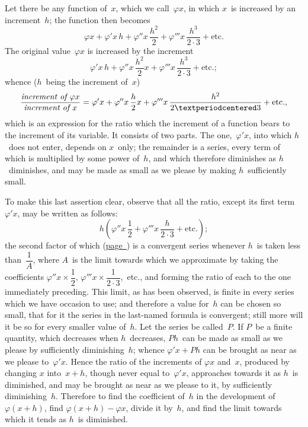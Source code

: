 \documentclass[12pt]{book}[2005/09/16]
\newcommand{\Pagelabel}[1]{\phantomsection\label{page:#1}}
\newcommand{\PageSep}[1]{\Pagelabel{#1}\ignorespaces}
\newcommand{\PageRef}[2][page]{\hyperref[page:#2]{#1~\pageref*{page:#2}}}
\renewcommand{\etc}{\text{etc}}
\renewcommand{\(}{{\upshape(}}
\renewcommand{\)}{{\upshape)}}
\renewcommand{\phi}{\varphi}
\begin{document}
Let there be any function of~$x$, which we call~$\phi x$,
in which $x$~is increased by an increment~$h$; the function
then becomes
\[
\phi x + \phi' x\, h
       + \phi'' x\, \frac{h^{2}}{2}
       + \phi''' x\, \frac{h^{3}}{2·3} + \etc.
\]
\PageSep{23}
The original value~$\phi x$ is increased by the increment
\[
\phi' x\, h + \phi'' x\, \frac{h^{2}}{2} x
            + \phi''' x\, \frac{h^{3}}{2·3} + \etc.;
\]
whence ($h$~being the increment of~$x$)
\[
\frac{\emph{increment of } \phi x}{\emph{increment of } x}
  = \phi' x + \phi'' x\, \frac{h}{2} x
            + \phi''' x\, \frac{h^{2}}{2·3} + \etc.,
\]
which is an expression for the ratio which the increment
of a function bears to the increment of its variable.
It consists of two parts. The one,~$\phi' x$, into
which $h$~does not enter, depends on $x$~only; the remainder
is a series, every term of which is multiplied
by some power of~$h$, and which therefore diminishes
as $h$~diminishes, and may be made as small as we
please by making $h$~sufficiently small.

To make this last assertion clear, observe that all
the ratio, except its first term~$\phi' x$, may be written as
follows:
\[
h\left(\phi'' x\, \frac{1}{2} + \phi''' x\, \frac{h}{2·3} + \etc.\right);
\]
the second factor of which (\PageRef{19}) is a convergent
series whenever $h$~is taken less than~$\dfrac{1}{A}$, where $A$~is
the limit towards which we approximate by taking
the coefficients $\phi'' x × \dfrac{1}{2}$, $\phi''' x × \dfrac{1}{2·3}$,~etc., and forming
the ratio of each to the one immediately preceding.
This limit, as has been observed, is finite in
every series which we have occasion to use; and
therefore a value for~$h$ can be chosen so small, that
for it the series in the last-named formula is convergent;
still more will it be so for every smaller value
of~$h$. Let the series be called~$P$. If $P$~be a finite quantity,
which decreases when $h$~decreases, $Ph$~can be
made as small as we please by sufficiently diminishing~$h$;
\PageSep{24}
whence $\phi' x + Ph$ can be brought as near as we
please to~$\phi' x$. Hence the ratio of the increments of
$\phi x$ and~$x$, produced by changing $x$ into~$x + h$, though
never equal to~$\phi' x$, approaches towards it as $h$~is diminished,
and may be brought as near as we please
to it, by sufficiently diminishing~$h$. Therefore to find
the coefficient of~$h$ in the development of~$\phi(x + h)$,
find $\phi(x + h) - \phi x$, divide it by~$h$, and find the limit
towards which it tends as $h$~is diminished.
\end{document}
